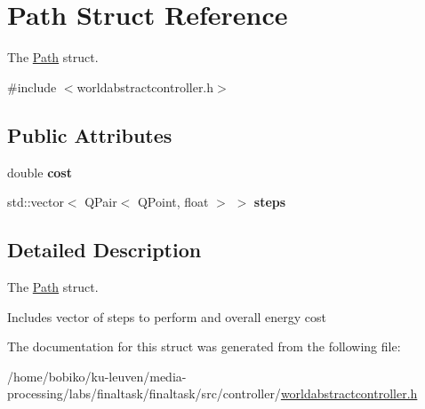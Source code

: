 \hypertarget{structPath}{}\section{Path Struct Reference}
\label{structPath}


The \hyperlink{structPath}{Path} struct.  




{\ttfamily \#include $<$worldabstractcontroller.\+h$>$}

\subsection*{Public Attributes}
\begin{DoxyCompactItemize}
\item 
double {\bfseries cost}\hypertarget{structPath_a4d54acc172b9690ba67bebec88c9d2c6}{}\label{structPath_a4d54acc172b9690ba67bebec88c9d2c6}

\item 
std\+::vector$<$ Q\+Pair$<$ Q\+Point, float $>$ $>$ {\bfseries steps}\hypertarget{structPath_a90f22adec5ae2f3f9dea7d029503e813}{}\label{structPath_a90f22adec5ae2f3f9dea7d029503e813}

\end{DoxyCompactItemize}


\subsection{Detailed Description}
The \hyperlink{structPath}{Path} struct. 

Includes vector of steps to perform and overall energy cost 

The documentation for this struct was generated from the following file\+:\begin{DoxyCompactItemize}
\item 
/home/bobiko/ku-\/leuven/media-\/processing/labs/finaltask/finaltask/src/controller/\hyperlink{worldabstractcontroller_8h}{worldabstractcontroller.\+h}\end{DoxyCompactItemize}

